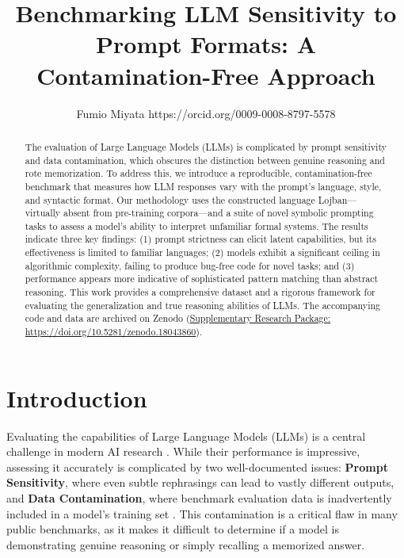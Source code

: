 \documentclass[11pt]{article}
\title{Benchmarking LLM Sensitivity to Prompt Formats: A Contamination-Free Approach}
\author{Fumio Miyata https://orcid.org/0009-0008-8797-5578}
\date{}
\begin{document}
\maketitle

\begin{abstract}
The evaluation of Large Language Models (LLMs) is complicated by prompt sensitivity and data contamination, which obscures the distinction between genuine reasoning and rote memorization. To address this, we introduce a reproducible, contamination-free benchmark that measures how LLM responses vary with the prompt's language, style, and syntactic format. Our methodology uses the constructed language Lojban---virtually absent from pre-training corpora---and a suite of novel symbolic prompting tasks to assess a model's ability to interpret unfamiliar formal systems. The results indicate three key findings: (1) prompt strictness can elicit latent capabilities, but its effectiveness is limited to familiar languages; (2) models exhibit a significant ceiling in algorithmic complexity, failing to produce bug-free code for novel tasks; and (3) performance appears more indicative of sophisticated pattern matching than abstract reasoning. This work provides a comprehensive dataset and a rigorous framework for evaluating the generalization and true reasoning abilities of LLMs. The accompanying code and data are archived on Zenodo (\href{https://doi.org/10.5281/zenodo.18043860}{Supplementary Research Package: https://doi.org/10.5281/zenodo.18043860}).
\end{abstract}

\section{Introduction}
\label{sec:introduction}

Evaluating the capabilities of Large Language Models (LLMs) is a central challenge in modern AI research \cite{zhao2023survey}. While their performance is impressive, assessing it accurately is complicated by two well-documented issues: \textbf{Prompt Sensitivity}, where even subtle rephrasings can lead to vastly different outputs, and \textbf{Data Contamination}, where benchmark evaluation data is inadvertently included in a model's training set \cite{vaugrante2025prompt}. This contamination is a critical flaw in many public benchmarks, as it makes it difficult to determine if a model is demonstrating genuine reasoning or simply recalling a memorized answer.
\end{document}
